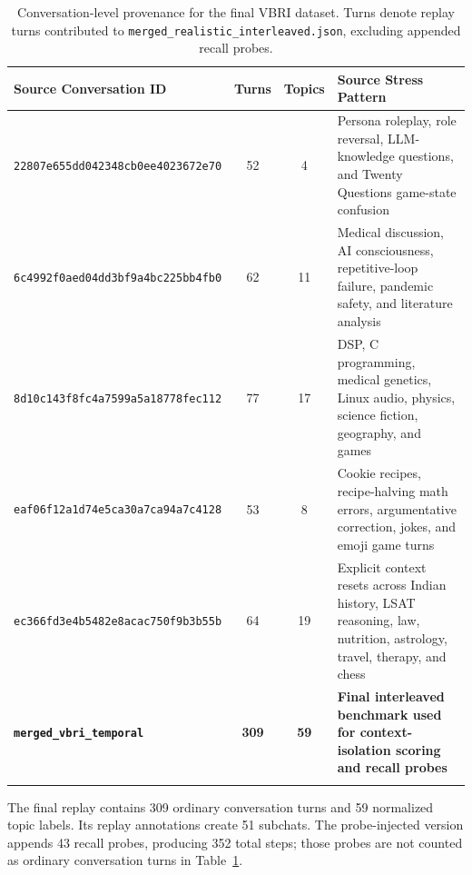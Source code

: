 \documentclass[pdflatex,sn-mathphys-num]{sn-jnl}%
\theoremstyle{thmstyleone}%
\theoremstyle{thmstyletwo}%
\theoremstyle{thmstylethree}%
\begin{document}
\begin{table}[htbp]
\caption{Conversation-level provenance for the final VBRI dataset. Turns denote replay turns contributed to \texttt{merged\_realistic\_interleaved.json}, excluding appended recall probes.}\label{tab:scenarios}
\centering
\scriptsize
\setlength{\tabcolsep}{4pt}
\begin{tabular*}{\textwidth}{@{\extracolsep\fill}p{3.2cm}ccp{6.0cm}@{}}
\toprule
\textbf{Source Conversation ID} & \textbf{Turns} & \textbf{Topics} & \textbf{Source Stress Pattern} \\
\midrule
\texttt{22807e655dd04}\newline\texttt{2348cb0ee402}\newline\texttt{3672e70} & 52 & 4 & Persona roleplay, role reversal, LLM-knowledge questions, and Twenty Questions game-state confusion \\
\texttt{6c4992f0aed04}\newline\texttt{dd3bf9a4bc225}\newline\texttt{bb4fb0} & 62 & 11 & Medical discussion, AI consciousness, repetitive-loop failure, pandemic safety, and literature analysis \\
\texttt{8d10c143f8fc4}\newline\texttt{a7599a5a1877}\newline\texttt{8fec112} & 77 & 17 & DSP, C programming, medical genetics, Linux audio, physics, science fiction, geography, and games \\
\texttt{eaf06f12a1d74}\newline\texttt{e5ca30a7ca94}\newline\texttt{a7c4128} & 53 & 8 & Cookie recipes, recipe-halving math errors, argumentative correction, jokes, and emoji game turns \\
\texttt{ec366fd3e4b54}\newline\texttt{82e8acac750f}\newline\texttt{9b3b55b} & 64 & 19 & Explicit context resets across Indian history, LSAT reasoning, law, nutrition, astrology, travel, therapy, and chess \\
\midrule
\textbf{\texttt{merged\_vbri\_temporal}} & \textbf{309} & \textbf{59} & \textbf{Final interleaved benchmark used for context-isolation scoring and recall probes} \\
\botrule
\end{tabular*}
\end{table}

The final replay contains 309 ordinary conversation turns and 59 normalized topic labels. Its replay annotations create 51 subchats. The probe-injected version appends 43 recall probes, producing 352 total steps; those probes are not counted as ordinary conversation turns in Table~\ref{tab:scenarios}.
\end{document}
